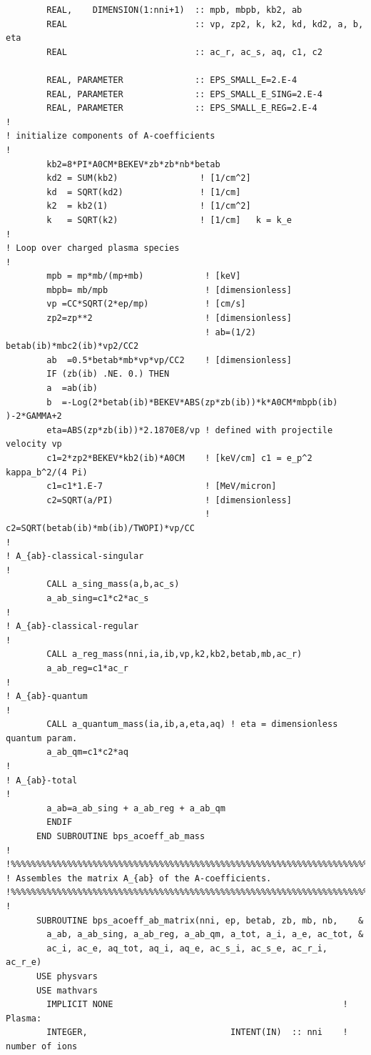 \documentclass[preprint,12pt,eqsecnum,nofootinbib,amsmath,amssymb]{revtex4}
\begin{document}
{\begin{verbatim}
        REAL,    DIMENSION(1:nni+1)  :: mpb, mbpb, kb2, ab
        REAL                         :: vp, zp2, k, k2, kd, kd2, a, b, eta
        REAL                         :: ac_r, ac_s, aq, c1, c2

        REAL, PARAMETER              :: EPS_SMALL_E=2.E-4
        REAL, PARAMETER              :: EPS_SMALL_E_SING=2.E-4
        REAL, PARAMETER              :: EPS_SMALL_E_REG=2.E-4
!
! initialize components of A-coefficients
!
        kb2=8*PI*A0CM*BEKEV*zb*zb*nb*betab
        kd2 = SUM(kb2)                ! [1/cm^2]
        kd  = SQRT(kd2)               ! [1/cm]
        k2  = kb2(1)                  ! [1/cm^2]
        k   = SQRT(k2)                ! [1/cm]   k = k_e
!
! Loop over charged plasma species
!
        mpb = mp*mb/(mp+mb)            ! [keV]
        mbpb= mb/mpb                   ! [dimensionless]
        vp =CC*SQRT(2*ep/mp)           ! [cm/s]
        zp2=zp**2                      ! [dimensionless]
                                       ! ab=(1/2) betab(ib)*mbc2(ib)*vp2/CC2
        ab  =0.5*betab*mb*vp*vp/CC2    ! [dimensionless] 
        IF (zb(ib) .NE. 0.) THEN
        a  =ab(ib)
        b  =-Log(2*betab(ib)*BEKEV*ABS(zp*zb(ib))*k*A0CM*mbpb(ib) )-2*GAMMA+2
        eta=ABS(zp*zb(ib))*2.1870E8/vp ! defined with projectile velocity vp
        c1=2*zp2*BEKEV*kb2(ib)*A0CM    ! [keV/cm] c1 = e_p^2 kappa_b^2/(4 Pi)
        c1=c1*1.E-7                    ! [MeV/micron]  
        c2=SQRT(a/PI)                  ! [dimensionless] 
                                       ! c2=SQRT(betab(ib)*mb(ib)/TWOPI)*vp/CC 
!
! A_{ab}-classical-singular 
!
        CALL a_sing_mass(a,b,ac_s) 
        a_ab_sing=c1*c2*ac_s
!
! A_{ab}-classical-regular 
!
        CALL a_reg_mass(nni,ia,ib,vp,k2,kb2,betab,mb,ac_r)
        a_ab_reg=c1*ac_r
!
! A_{ab}-quantum
!
        CALL a_quantum_mass(ia,ib,a,eta,aq) ! eta = dimensionless quantum param.
        a_ab_qm=c1*c2*aq
!
! A_{ab}-total
!
        a_ab=a_ab_sing + a_ab_reg + a_ab_qm
        ENDIF
      END SUBROUTINE bps_acoeff_ab_mass
!
!%%%%%%%%%%%%%%%%%%%%%%%%%%%%%%%%%%%%%%%%%%%%%%%%%%%%%%%%%%%%%%%%%%%%%%%%%%%%
! Assembles the matrix A_{ab} of the A-coefficients.
!%%%%%%%%%%%%%%%%%%%%%%%%%%%%%%%%%%%%%%%%%%%%%%%%%%%%%%%%%%%%%%%%%%%%%%%%%%%%
!
      SUBROUTINE bps_acoeff_ab_matrix(nni, ep, betab, zb, mb, nb,    &
        a_ab, a_ab_sing, a_ab_reg, a_ab_qm, a_tot, a_i, a_e, ac_tot, &
        ac_i, ac_e, aq_tot, aq_i, aq_e, ac_s_i, ac_s_e, ac_r_i, ac_r_e)
      USE physvars
      USE mathvars    
        IMPLICIT NONE                                             ! Plasma:
        INTEGER,                            INTENT(IN)  :: nni    !  number of ions

\end{verbatim}}
\end{document}
